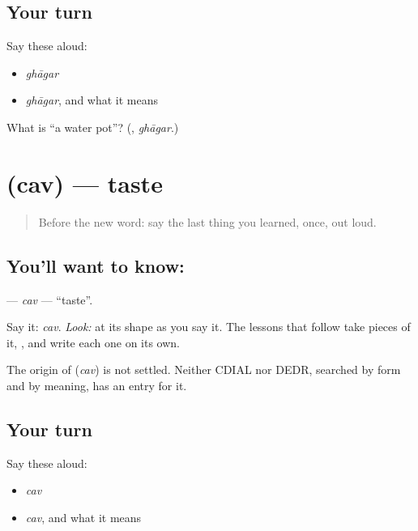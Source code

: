 \subsection*{Your turn}
Say these aloud:

\begin{itemize}
\raggedright
  \item \emph{ghāgar}
  \item \emph{ghāgar}, and what it means
\end{itemize}

\begin{tcolorbox}[breakable,colback=teal!4,colframe=teal!35!black,title={Before you move on}]
What is \textquotedblleft{}a water pot\textquotedblright{}? (\textbf{}, \emph{ghāgar}.)
\end{tcolorbox}
\section[\texorpdfstring{\mr{चव} (cav)}{चव (cav)}]{ (cav) — taste}

\label{lesson:MR-C06-chav}



\begin{quote}
Before the new word: say the last thing you learned, once, out loud.
\end{quote}

\subsection*{You'll want to know: }
\textbf{} — \emph{cav} — \textquotedblleft{}taste\textquotedblright{}.

Say it: \emph{cav}. \emph{Look:} at its shape as you say it. The lessons that follow take pieces of it, \textbf{}, and write each one on its own.

\begin{cousinweb}
The origin of \textbf{} (\emph{cav}) is not settled. Neither CDIAL nor DEDR, searched by form and by meaning, has an entry for it.
\end{cousinweb}

\subsection*{Your turn}
Say these aloud:

\begin{itemize}
\raggedright
  \item \emph{cav}
  \item \emph{cav}, and what it means
\end{itemize}

